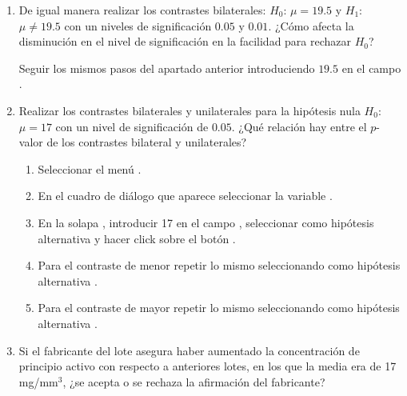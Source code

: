 \begin{enumerate}[leftmargin=*]
\begin{enumerate}
\item De igual manera realizar los contrastes bilaterales: $H_0$: $\mu=19.5$ y $H_1$: $\mu\neq19.5$ con un niveles de
significación $0.05$ y $0.01$.
¿Cómo afecta la disminución en el nivel de significación en la facilidad para rechazar $H_0$?

\begin{indicacion}Seguir los mismos pasos del apartado anterior introduciendo $19.5$ en el campo .
\end{indicacion}

\item Realizar los contrastes bilaterales y unilaterales para la hipótesis nula $H_0$: $\mu=17$ con un nivel de significación de $0.05$.
¿Qué relación hay entre el $p$-valor de los contrastes bilateral y unilaterales?
\begin{indicacion}
\begin{enumerate}
\item Seleccionar el menú .
\item En el cuadro de diálogo que aparece seleccionar la variable .
\item En la solapa , introducir 17 en el campo , seleccionar como
hipótesis alternativa  y hacer click sobre el botón .
\item Para el contraste de menor repetir lo mismo seleccionando como hipótesis alternativa .
\item Para el contraste de mayor repetir lo mismo seleccionando como hipótesis alternativa .
\end{enumerate}
\end{indicacion}

\item Si el fabricante del lote asegura haber aumentado la concentración de principio activo con respecto a anteriores
lotes, en los que la media era de 17 mg/mm$^3$, ¿se acepta o se rechaza la afirmación del fabricante?


\end{enumerate}
\end{enumerate}
